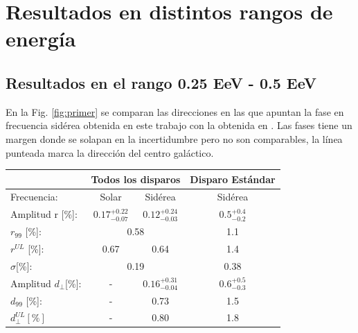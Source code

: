 \section{Resultados en distintos rangos de energía}
\subsection{Resultados en el rango 0.25 EeV - 0.5 EeV}

En la Fig. \ref{fig:primer} se comparan las direcciones en las que apuntan la fase en frecuencia sidérea obtenida en este trabajo con la obtenida en \cite{Aab_2020}. 
Las fases tiene un margen donde se solapan en la incertidumbre pero no son comparables, la línea punteada marca la dirección del centro galáctico.
\begin{table}[H]
    \begin{small}
        \begin{center}
            \begin{tabular}[c]{l|c|c||c|}
\cline{2-4}                                       & \multicolumn{2}{c||}{Todos los disparos}    & \multicolumn{1}{c|}{Disparo Estándar}   \\ \hline
\multicolumn{1}{|l|}{Frecuencia:                } & Solar	                & Sidérea	                & Sidérea \cite{Aab_2020}   \\ \hline
\multicolumn{1}{|l|}{Amplitud r [\%]:           } & $0.17^{+0.22}_{-0.07}$	& $0.12^{+0.24}_{-0.03}$ 	& $0.5^{+0.4}_{-0.2}$ \cite{codigo}      \\
\multicolumn{1}{|l|}{$r_{99}$ [\%]:             } & \multicolumn{2}{c||}{0.58}                          & 1.1\cite{codigo}                 \\
\multicolumn{1}{|l|}{$r^{UL}$ [\%]:             } & 0.67 	                & 0.64                      & 1.4\cite{codigo}                 \\ 
\multicolumn{1}{|l|}{$\sigma$[\%]:              } & \multicolumn{2}{c||}{0.19}                          & 0.38\cite{codigo}       \\\hline
\multicolumn{1}{|l|}{Amplitud $d_\perp$[\%]:    } & -	                    & $0.16^{+0.31}_{-0.04}$ 	& $0.6^{+0.5}_{-0.3}$       \\
\multicolumn{1}{|l|}{$d_{99}$ [\%]:             } & - 	                    & 0.73                      & 1.5  \cite{codigo}                \\
\multicolumn{1}{|l|}{$d_{\perp}^{UL}[\%]$       } & -                       & 0.80                      & 1.8                         \\

\end{tabular}
\end{center}
\end{small}
\end{table}
